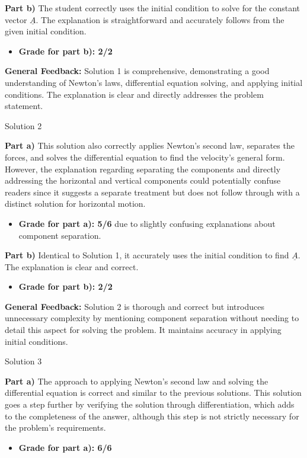 \documentclass[a4paper,11pt]{article}
\begin{document}
\textbf{Part b)} The student correctly uses the initial condition to solve for the constant vector \( \underline{A} \). The explanation is straightforward and accurately follows from the given initial condition.
\begin{itemize}
    \item \textbf{Grade for part b): 2/2}
\end{itemize}

\textbf{General Feedback:} Solution 1 is comprehensive, demonstrating a good understanding of Newton's laws, differential equation solving, and applying initial conditions. The explanation is clear and directly addresses the problem statement.

Solution 2

\textbf{Part a)} This solution also correctly applies Newton's second law, separates the forces, and solves the differential equation to find the velocity's general form. However, the explanation regarding separating the components and directly addressing the horizontal and vertical components could potentially confuse readers since it suggests a separate treatment but does not follow through with a distinct solution for horizontal motion.
\begin{itemize}
    \item \textbf{Grade for part a): 5/6} due to slightly confusing explanations about component separation.
\end{itemize}

\textbf{Part b)} Identical to Solution 1, it accurately uses the initial condition to find \( \underline{A} \). The explanation is clear and correct.
\begin{itemize}
    \item \textbf{Grade for part b): 2/2}
\end{itemize}

\textbf{General Feedback:} Solution 2 is thorough and correct but introduces unnecessary complexity by mentioning component separation without needing to detail this aspect for solving the problem. It maintains accuracy in applying initial conditions.

Solution 3

\textbf{Part a)} The approach to applying Newton's second law and solving the differential equation is correct and similar to the previous solutions. This solution goes a step further by verifying the solution through differentiation, which adds to the completeness of the answer, although this step is not strictly necessary for the problem's requirements.
\begin{itemize}
    \item \textbf{Grade for part a): 6/6}
\end{itemize}
\end{document}
